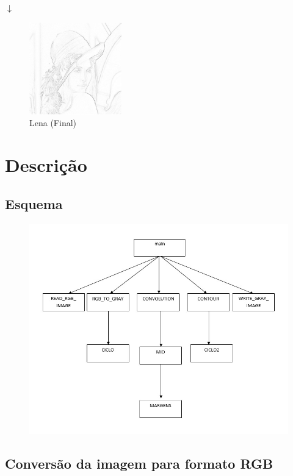 \documentclass[a4paper,11pt]{article}
\begin{document}
\begin{center}
$\downarrow$
\end{center}

\begin{figure}[ht!]
\centering
\includegraphics[width=40mm]{Lena(final)}
\caption{Lena (Final)}
\label{overflow}
\end{figure}


\newpage

\section{Descrição}
\subsection{Esquema}

\begin{figure}[ht!]
\centering
\includegraphics[width=160mm]{esquema}
\label{overflow}
\end{figure}

\newpage
\subsection{Conversão da imagem para formato RGB}
\end{document}
